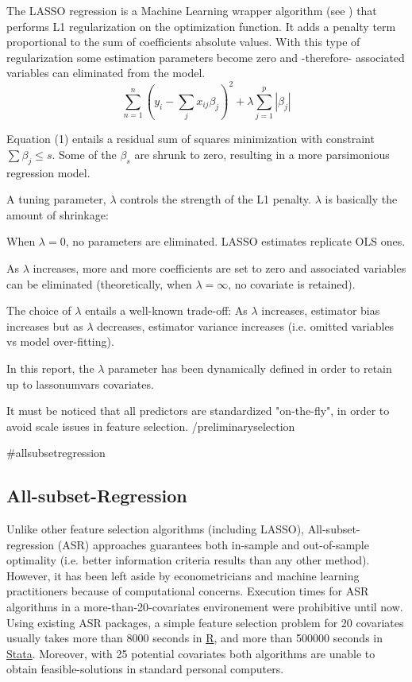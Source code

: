 \documentclass{article}
\begin{document}
The LASSO regression is a Machine Learning wrapper algorithm (see \cite{chandrashekar2014}) that performs L1 regularization on the optimization function. It adds a penalty term proportional to the sum of coefficients absolute values. With this type of regularization some estimation parameters become zero and -therefore- associated variables can eliminated from the model.
\begin{equation}
    \sum_{n=1}^{n}(y_i - \sum_{j}x_{ij}\beta_{j})^2 + \lambda \sum_{j=1}^p|\beta_{j}|
\end{equation}

Equation (1) entails a residual sum of squares minimization with constraint $\sum \beta_{j}\leq s$. Some of the $\beta_s$ are shrunk to zero, resulting in a more parsimonious regression model.

A tuning parameter, $\lambda$ controls the strength of the L1 penalty. $\lambda$ is basically the amount of shrinkage:

When $ \lambda = 0$, no parameters are eliminated. LASSO estimates replicate OLS ones.

As $\lambda$ increases, more and more coefficients are set to zero and associated variables can be eliminated (theoretically, when $\lambda = \infty$, no covariate is retained).

The choice of $\lambda$ entails a well-known trade-off:  As $\lambda$ increases, estimator bias increases but as $\lambda$ decreases, estimator variance increases (i.e. omitted variables vs model over-fitting).

In this report, the $\lambda$ parameter has been dynamically defined in order to retain up to {{lassonumvars}} covariates.

It must be noticed that all predictors are standardized "on-the-fly", in order to avoid scale issues in feature selection.
{{/preliminaryselection}}

{{#allsubsetregression}}
\subsection{All-subset-Regression}
Unlike other feature selection algorithms (including LASSO), All-subset-regression (ASR) approaches guarantees both in-sample and out-of-sample optimality (i.e. better information criteria results than any other method). However, it has been left aside by econometricians and machine learning practitioners because of computational concerns. Execution times for ASR algorithms in a more-than-20-covariates environement were prohibitive until now. Using existing ASR packages, a simple feature selection problem for 20 covariates usually takes more than 8000 seconds in 
\href{https://cran.r-project.org/web/packages/MuMIn/MuMIn.pdf}{R}, and more than 500000 seconds in \href{https://ideas.repec.org/c/boc/bocode/s457737.html#download}{Stata}. Moreover, with 25 potential covariates both algorithms are unable to obtain feasible-solutions in standard personal computers.
\end{document}
